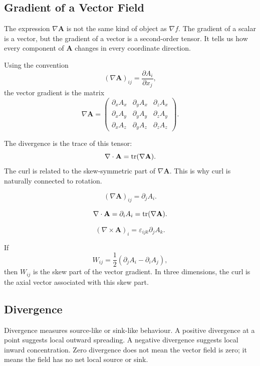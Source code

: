 \documentclass{otscience}
\begin{document}
\subsection{Gradient of a Vector Field}

The expression \(\nabla\mathbf{A}\) is not the same kind of object as \(\nabla f\). The gradient of a scalar is a vector, but the gradient of a vector is a second-order tensor. It tells us how every component of \(\mathbf{A}\) changes in every coordinate direction.

Using the convention
\[
    {(\nabla\mathbf{A})}_{ij}=\frac{\partial A_i}{\partial x_j},
\]
the vector gradient is the matrix
\[
    \nabla\mathbf{A}=
    \begin{pmatrix}
        \partial_x A_x & \partial_y A_x & \partial_z A_x \\
        \partial_x A_y & \partial_y A_y & \partial_z A_y \\
        \partial_x A_z & \partial_y A_z & \partial_z A_z
    \end{pmatrix}.
\]

The divergence is the trace of this tensor:
\[
    \nabla\cdot\mathbf{A}=\operatorname{tr}(\nabla\mathbf{A}).
\]
The curl is related to the skew-symmetric part of \(\nabla\mathbf{A}\). This is why curl is naturally connected to rotation.

\begin{formulabox}
    \[
        {(\nabla\mathbf{A})}_{ij}=\partial_j A_i.
    \]

    \[
        \nabla\cdot\mathbf{A}=\partial_i A_i=\operatorname{tr}(\nabla\mathbf{A}).
    \]

    \[
        {(\nabla\times\mathbf{A})}_i=\varepsilon_{ijk}\partial_j A_k.
    \]

    If
    \[
        W_{ij}=\frac12(\partial_{j}A_i-\partial_{i}A_j),
    \]
    then \(W_{ij}\) is the skew part of the vector gradient. In three dimensions, the curl is the axial vector associated with this skew part.
\end{formulabox}

\subsection{Divergence}

Divergence measures source-like or sink-like behaviour. A positive divergence at a point suggests local outward spreading. A negative divergence suggests local inward concentration. Zero divergence does not mean the vector field is zero; it means the field has no net local source or sink.
\end{document}
